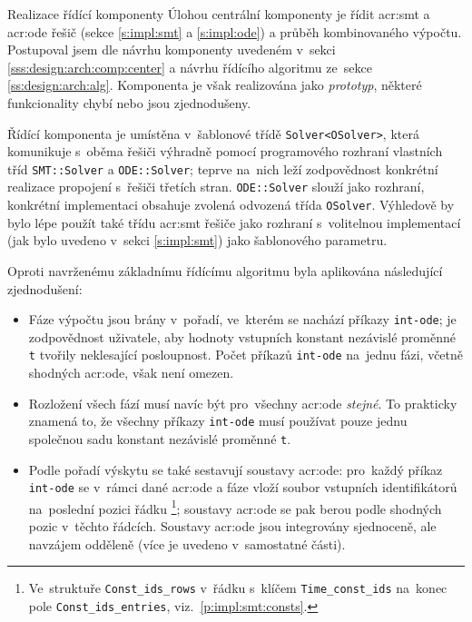\documentclass[thesis=M,czech]{FITthesis}[2012/06/26]
\newcommand{\acrlabel}[1]{acr:#1}
\newcommand{\acr}[1]{\acrshort{\acrlabel{#1}}}
\newcommand{\id}[1]{\texttt{#1}}
\newcommand{\hl}[1]{\textit{#1}}
\newcommand{\rf}[1]{\ref{#1}}
\begin{document}
\begin{section}{Realizace řídící komponenty}\label{s:impl:center}
Úlohou centrální komponenty je řídit \acr{smt} a \acr{ode} řešič
(sekce \rf{s:impl:smt} a \rf{s:impl:ode})
a průběh kombinovaného výpočtu.
Postupoval jsem dle návrhu komponenty
uvedeném v~sekci \rf{sss:design:arch:comp:center}
a návrhu řídícího algoritmu ze~sekce \rf{ss:design:arch:alg}.
Komponenta je však realizována jako \hl{prototyp},
některé funkcionality chybí
nebo jsou zjednodušeny.

Řídící komponenta je umístěna v~šablonové třídě \id{Solver<OSolver>},
která komunikuje s~oběma řešiči
výhradně pomocí programového rozhraní
vlastních tříd \id{SMT::\-Solver} a \id{ODE::\-Solver};
teprve na~nich leží zodpovědnost
konkrétní realizace propojení s~řešiči třetích stran.
\id{ODE::\-Solver} slouží jako rozhraní,
konkrétní implementaci obsahuje
zvolená odvozená třída \id{OSolver}.
Výhledově by bylo lépe použít také třídu \acr{smt}
řešiče jako rozhraní s~volitelnou implementací
(jak bylo uvedeno v~sekci \rf{s:impl:smt})
jako šablonového parametru.

Oproti navrženému základnímu řídícímu algoritmu
byla aplikována následující zjednodušení:
\begin{itemize}
\item Fáze výpočtu jsou brány v~pořadí,
   ve~kterém se nachází příkazy \id{int\--ode};
   je zodpovědnost uživatele,
   aby hodnoty vstupních konstant nezávislé proměnné \id{t}
   tvořily neklesající posloupnost.
   Počet příkazů \id{int\--ode} na~jednu fázi,
   včetně shodných \acr{ode},
   však není omezen.
\item Rozložení všech fází musí navíc být pro~všechny \acr{ode} \hl{stejné}.
   To prakticky znamená to, že všechny příkazy \id{int\--ode}
   musí používat pouze jednu společnou sadu konstant
   nezávislé proměnné \id{t}.
\item Podle pořadí výskytu se také sestavují soustavy \acr{ode}:
   pro~každý příkaz \id{int\--ode}
   se v~rámci dané \acr{ode} a fáze
   vloží soubor vstupních identifikátorů na~poslední pozici řádku%
   \footnote{Ve~struktuře \id{Const\_\-ids\_\-rows}
   v~řádku s~klíčem \id{Time\_\-const\_\-ids}
   na~konec pole \id{Const\_\-ids\_\-entries},
   viz.~\rf{p:impl:smt:consts}.};
   soustavy \acr{ode} se pak berou podle shodných pozic
   v~těchto řádcích. Soustavy \acr{ode}
   jsou integrovány sjednoceně,
   ale navzájem odděleně
   (více je uvedeno v~samostatné části).
\end{itemize}


\end{section}
\end{document}
